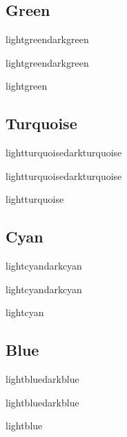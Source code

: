 \documentclass[10pt,twoside,twocolumn]{article}
\begin{document}
\subsection{Green}
\begin{quotebox}{lightgreen}{darkgreen}
    \lipsum[1][1-4]
\end{quotebox}
\begin{paperbox}{}{lightgreen}{darkgreen}
    \lipsum[1][5-9]
\end{paperbox}
\begin{commentbox}{}{lightgreen}
    \lipsum[2][1-5]
\end{commentbox}

\subsection{Turquoise}
\begin{quotebox}{lightturquoise}{darkturquoise}
    \lipsum[1][1-4]
\end{quotebox}
\begin{paperbox}{}{lightturquoise}{darkturquoise}
    \lipsum[1][5-9]
\end{paperbox}
\begin{commentbox}{}{lightturquoise}
    \lipsum[2][1-5]
\end{commentbox}

\subsection{Cyan}
\begin{quotebox}{lightcyan}{darkcyan}
    \lipsum[1][1-4]
\end{quotebox}
\begin{paperbox}{}{lightcyan}{darkcyan}
    \lipsum[1][5-9]
\end{paperbox}
\begin{commentbox}{}{lightcyan}
    \lipsum[2][1-5]
\end{commentbox}

\subsection{Blue}
\begin{quotebox}{lightblue}{darkblue}
    \lipsum[1][1-4]
\end{quotebox}
\begin{paperbox}{}{lightblue}{darkblue}
    \lipsum[1][5-9]
\end{paperbox}
\begin{commentbox}{}{lightblue}
    \lipsum[2][1-5]
\end{commentbox}
\end{document}
